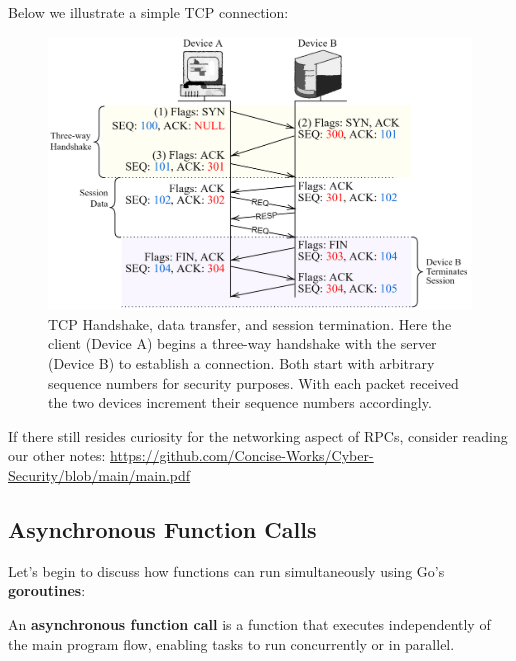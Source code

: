 \newpage 
\noindent
Below we illustrate a simple TCP connection:
\begin{figure}[h]
    \centering
    \includegraphics[width=1\textwidth]{Sections/rpc/sync.png}

    \vspace{1em}
    \caption{TCP Handshake, data transfer, and session termination.
    Here the client (Device A) begins a three-way handshake with the server (Device B) to establish a connection. Both start with 
    arbitrary sequence numbers for security purposes. With each packet received the two devices increment their sequence numbers accordingly.\\
    }
    \label{fig:tcp}
\end{figure}

\vspace{-1em}
\begin{Tip} If there still resides curiosity for the networking aspect of RPCs, consider reading our other notes:
    \href{https://github.com/Concise-Works/Cyber-Security/blob/main/main.pdf}{https://github.com/Concise-Works/Cyber-Security/blob/main/main.pdf}
\end{Tip}

\subsection{Asynchronous Function Calls}
Let's begin to discuss how functions can run simultaneously using Go's \textbf{goroutines}:
\begin{Def}

    An \textbf{asynchronous function call} is a function that executes independently of the main program flow, enabling tasks to run concurrently or in parallel.

\end{Def}
\newpage

